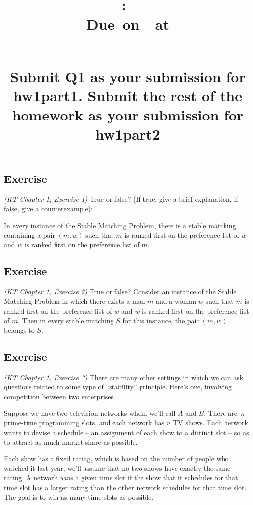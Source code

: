 \documentclass{article}
\title{
    \vspace{2in}
    \textbf{\hmwkClass:\ \hmwkTitle}\\
    \normalsize\vspace{0.1in}\small{Due\ on\ \hmwkDueDate\ at \hmwkDueTime}\\
    \vspace{0.1in}\large{\textit{\hmwkClassInstructor\ \hmwkSection}} \\
    \vspace{0.8in}
    \begin{minipage}[t]{0.4\columnwidth}
        \footnotesize
        \textbf{Submit Q1 as your submission for hw1part1. Submit the rest of the homework as your submission for hw1part2}
    \vspace{0.5in}
    \end{minipage}
    \vspace{0.8in}
    \author{\textbf{\hmwkAuthorName}}
    \date{}
}
\newcounter{counter}
\newcommand{\Exercise}{Exercise \stepcounter{counter}\thecounter}
\begin{document}
\maketitle
\pagebreak

\subsection*{\Exercise}
    \textit{(KT Chapter 1, Exercise 1)} True or false?  (If true, give a brief explanation, if false, give a counterexample): 
    
    In every instance of the Stable Matching Problem, there is a stable matching containing a pair $(m, w)$ such that $m$ is ranked first on the preference list of $w$ and $w$ is ranked first on the preference list of $m$.

\subsection*{\Exercise}
    \textit{(KT Chapter 1, Exercise 2)}  True or false? Consider an instance of the Stable Matching Problem in which there exists a man $m$ and a woman $w$ such that $m$ is ranked first on the preference list of $w$ and $w$ is ranked first on the
    preference list of $m$.  Then in every stable matching $S$ for this instance, the pair $(m, w)$ belongs to $S$.

\subsection*{\Exercise}
    \textit{(KT Chapter 1, Exercise 3)} There are many other settings in which we can ask questions related to some type of ``stability'' principle.  Here's one, involving competition between two enterprises.

    \vspace{2mm}
    Suppose we have two television networks whom we'll call $A$ and $B$.  There are~$n$ prime-time
    programming slots, and each network has $n$ TV shows.  Each network wants to devise a schedule -- an assignment of each show to a distinct slot -- so as to attract as much market share as possible.

    \vspace{2mm}
    Each show has a fixed rating, which is based on the number of people who watched it last year;  we'll assume that no two shows have exactly the same rating.  A network {\it wins} a given time slot if the show that it schedules for that time slot has a larger rating than the other network schedules for that time slot.  The goal is to win as many time slots as possible.
\end{document}
